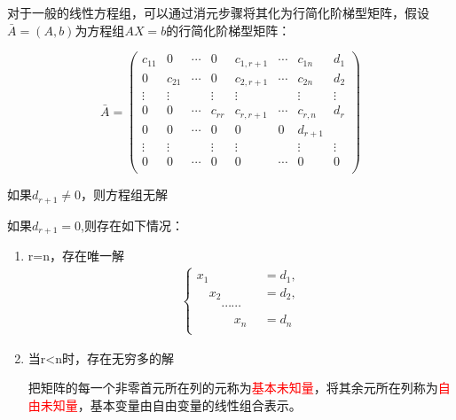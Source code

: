 \begin{theorem}

    \begin{center}
    \end{center}

    对于一般的线性方程组，可以通过消元步骤将其化为行简化阶梯型矩阵，假设$\bar A=(A,b)$为方程组$AX=b$的行简化阶梯型矩阵：

\begin{equation*}
        \bar A=\begin{pmatrix}
            c_{11}&0&\cdots&0&c_{1,r+1}&\cdots&c_{1n}&d_1\\
            0&c_{21}&\cdots&0&c_{2,r+1}&\cdots&c_{2n}&d_2\\
            \vdots&\vdots&\ &\vdots&\vdots&\ &\vdots&\vdots\\
            0&0&\cdots&c_{rr}&c_{r,r+1}&\cdots&c_{r,n}&d_{r}\\
            0&0&\cdots&0&0&0&d_{r+1}\\
            \vdots&\vdots&\ &\vdots&\vdots&\ &\vdots&\vdots\\
            0&0&\cdots&0&0&\cdots&0&0\\
        \end{pmatrix}
\end{equation*}

如果$d_{r+1}\neq 0$，则方程组无解

如果$d_{r+1}=0$,则存在如下情况：

\begin{enumerate}
    \item r=n，存在唯一解
    $$
    \begin{aligned}
        \begin{cases}
            x_1\quad \quad \quad &=d_1,\\
            \quad x_2\quad \quad &=d_2,\\
            \quad \quad \cdots\cdots\quad &\\
            \quad\quad \quad  x_n&=d_n\\
        \end{cases}
    \end{aligned}
    $$

    \item 当r<n时，存在无穷多的解

    把矩阵的每一个非零首元所在列的元称为\textcolor{red}{基本未知量}，将其余元所在列称为\textcolor{red}{自由未知量}，基本变量由自由变量的线性组合表示。
\end{enumerate}
\end{theorem}

